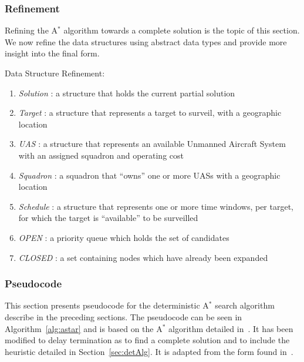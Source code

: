 \documentclass[conference]{IEEEtran}
\begin{document}
\subsubsection{Refinement}

Refining the A$^*$ algorithm towards a complete solution is the topic of this
section. We now refine the data structures using abstract data types and
provide more insight into the final form.

Data Structure Refinement:
\begin{enumerate}
  \item[] \emph{Solution} : a structure that holds the current partial solution
  \item[] \emph{Target} : a structure that represents a target to surveil, with
    a geographic location
  \item[] \emph{UAS} : a structure that represents an available Unmanned
    Aircraft System with an assigned squadron and operating cost
  \item[] \emph{Squadron} : a squadron that ``owns'' one or more UASs with a
    geographic location
  \item[] \emph{Schedule} : a structure that represents one or more time
    windows, per target, for which the target is ``available'' to be surveilled
  \item[] \emph{OPEN} : a priority queue which holds the set of candidates
  \item[] \emph{CLOSED} : a set containing nodes which have already been
    expanded
\end{enumerate}

\subsubsection{Pseudocode} \label{sec:astarPseudo}

This section presents pseudocode for the deterministic A$^*$ search algorithm
describe in the preceding sections. The pseudocode can be seen in
Algorithm~\ref{alg:astar} and is based on the A$^*$ algorithm detailed
in~\cite{pearl1984}. It has been modified to delay termination as to find a
complete solution and to include the heuristic detailed in
Section~\ref{sec:detAlg}. It is adapted from the form found in~\cite{pjcvphw8}.
\end{document}
